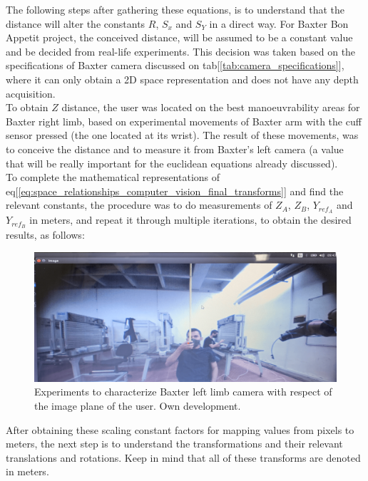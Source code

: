 \documentclass[11pt]{report} %
\begin{document}
The following steps after gathering these equations, is to understand that the  distance will alter the constants $R$, $S_{x}$ and $S_{Y}$ in a direct way. For Baxter Bon Appetit project, the conceived  distance, will be assumed to be a constant value and be decided from real-life experiments. This decision was taken based on the specifications of Baxter camera discussed on tab[\ref{tab:camera_specifications}], where it can only obtain a 2D space representation and does not have any depth acquisition.\\

To obtain $Z$ distance, the user was located on the best manoeuvrability areas for Baxter right limb, based on experimental movements of Baxter arm with the cuff sensor pressed (the one located at its wrist). The result of these movements, was to conceive the distance and to measure it from Baxter's left camera (a value that will be really important for the euclidean equations already discussed).\\

To complete the mathematical representations of eq[\ref{eq:space_relationships_computer_vision_final_transforms}] and find the relevant constants, the procedure was to do measurements of $Z_{A}$, $Z_{B}$, $Y_{ref_{A}}$ and $Y_{ref_{B}}$ in meters, and repeat it through multiple iterations, to obtain the desired results, as follows:

\begin{figure}[H]
    \centering
    \includegraphics[width=1.0\linewidth]{assets/imgs/computer_vision/computer_vision_3d_measurements_experiments.png}
    \caption{Experiments to characterize Baxter left limb camera with respect of the image plane of the user. Own development.} 
    \label{fig_real_life_experiments_3d_measurements_frames}
\end{figure}

After obtaining these scaling constant factors for mapping values from pixels to meters, the next step is to understand the transformations and their relevant translations and rotations. Keep in mind that all of these transforms are denoted in meters.\\
\end{document}

